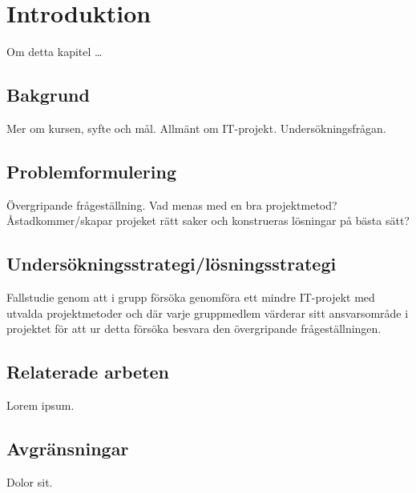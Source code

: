 \section{Introduktion}
Om detta kapitel \dots

\subsection{Bakgrund}
Mer om kursen, syfte och mål. Allmänt om IT-projekt. Undersökningsfrågan.

\subsection{Problemformulering}
Övergripande frågeställning.
Vad menas med en bra projektmetod? Åstadkommer/skapar projeket rätt saker och konstrueras
lösningar på bästa sätt?

\subsection{Undersökningsstrategi/lösningsstrategi}
Fallstudie genom att i grupp försöka genomföra ett mindre IT-projekt med utvalda projektmetoder
och där varje gruppmedlem värderar sitt ansvarsområde i projektet för att ur detta försöka
besvara den övergripande frågeställningen.

\subsection{Relaterade arbeten}
Lorem ipsum.

\subsection{Avgränsningar}
Dolor sit.
